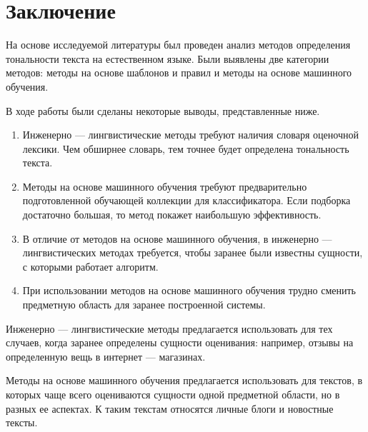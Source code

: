 \chapter{Заключение}
На основе исследуемой литературы был проведен анализ методов определения тональности текста на естественном языке. Были выявлены две категории методов: методы на основе шаблонов и правил и методы на основе машинного обучения. 

В ходе работы были сделаны некоторые выводы, представленные ниже.
\begin{enumerate}
	\item Инженерно --- лингвистические методы требуют наличия словаря оценочной лексики. Чем обширнее словарь, тем точнее будет определена тональность текста.
	\item Методы на основе машинного обучения требуют предварительно подготовленной обучающей коллекции для классификатора. Если подборка достаточно большая, то метод покажет наибольшую эффективность. 
	\item В отличие от методов на основе машинного обучения, в инженерно --- лингвистических методах требуется, чтобы заранее были известны сущности, с которыми работает алгоритм.  
	\item При использовании методов на основе машинного обучения трудно сменить предметную область для заранее построенной системы. 
\end{enumerate} 


Инженерно --- лингвистические методы предлагается использовать для тех случаев, когда заранее определены сущности оценивания: например, отзывы на определенную вещь в интернет --- магазинах. 

Методы на основе машинного обучения предлагается использовать для текстов, в которых чаще всего оцениваются сущности одной предметной области, но в разных ее аспектах. К таким текстам относятся личные блоги и новостные тексты. 